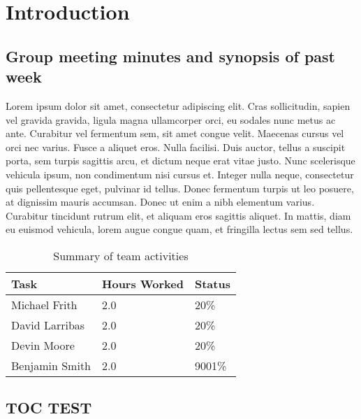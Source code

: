 \documentclass[12pt,article]{IEEEtran}
\begin{document}

	 
\section{Introduction}
	\subsection{Group meeting minutes and synopsis of past week}
	
	Lorem ipsum dolor sit amet, consectetur adipiscing elit. Cras sollicitudin, sapien vel gravida gravida, ligula magna ullamcorper orci, eu sodales nunc metus ac ante. Curabitur vel fermentum sem, sit amet congue velit. Maecenas cursus vel orci nec varius. Fusce a aliquet eros. Nulla facilisi. Duis auctor, tellus a suscipit porta, sem turpis sagittis arcu, et dictum neque erat vitae justo. Nunc scelerisque vehicula ipsum, non condimentum nisi cursus et. Integer nulla neque, consectetur quis pellentesque eget, pulvinar id tellus. Donec fermentum turpis ut leo posuere, at dignissim mauris accumsan. Donec ut enim a nibh elementum varius. Curabitur tincidunt rutrum elit, et aliquam eros sagittis aliquet. In mattis, diam eu euismod vehicula, lorem augue congue quam, et fringilla lectus sem sed tellus.
	
	\begin{table}[ht]
		\renewcommand{\arraystretch}{1.3}
		\caption{Summary of team activities}
		
		\label{Summary of team activities}
		
		\centering
		\begin{tabular}{p{5.5cm}|p{1cm}|p{1cm}}
		\hline
		\bfseries 	Task		 		& \bfseries Hours Worked	& \bfseries Status	\\
		\hline
		\hline
					Michael Frith		& 2.0						& 20\%				\\	%
					David Larribas 		& 2.0						& 20\%				\\	
					Devin Moore 		& 2.0						& 20\%				\\	
					Benjamin Smith		& 2.0						& 9001\%			\\	
		\hline
		\end{tabular}
		
		\subsection{TOC TEST}
		
	\end{table}
\end{document}
